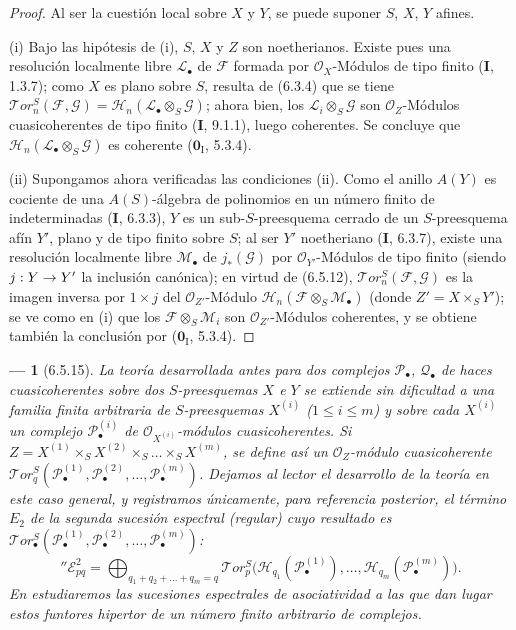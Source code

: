 \documentclass[10pt,oneside,openany]{book}
\theoremstyle{egaenv}\newtheorem*{env}{---}
\theoremstyle{egastatement}
\theoremstyle{egadescription}
\newcommand{\oldpage}[2][]{\marginnote{\normalfont\scriptsize\textbf{#1}\,|\,#2}\ignorespaces}
\renewcommand{\to}{\mathchoice{\longrightarrow}{\rightarrow}{\rightarrow}{\rightarrow}}
\begin{document}
\begin{proof}
Al ser la cuestión local sobre $X$ y $Y$, se puede suponer $S$, $X$, $Y$
afines.

\textnormal{(i)} Bajo las hipótesis de (i), $S$, $X$ y $Z$ son noetherianos.
Existe pues una resolución localmente libre $\mathscr L_\bullet$ de
$\mathscr F$ formada por $\mathscr O_X$-Módulos de tipo finito (\textbf{I}, 1.3.7); como
$X$ es plano sobre $S$, resulta de (6.3.4) que se tiene
$\mathscr{T}\!or_n^S(\mathscr F,\mathscr G)
=\mathscr H_n(\mathscr L_\bullet\otimes_S\mathscr G)$;
ahora bien, los $\mathscr L_i\otimes_S\mathscr G$ son $\mathscr O_Z$-Módulos
cuasicoherentes de tipo finito (\textbf{I}, 9.1.1), luego coherentes. Se concluye que
$\mathscr H_n(\mathscr L_\bullet\otimes_S\mathscr G)$ es coherente
($\mathbf{0}_{\mathrm I}$, 5.3.4).

\textnormal{(ii)} Supongamos ahora verificadas las condiciones (ii). Como
el anillo $A(Y)$ es cociente de una $A(S)$-álgebra de polinomios en un número finito
de indeterminadas (\textbf{I}, 6.3.3), $Y$ es un sub-$S$-preesquema cerrado de un
$S$-preesquema afín $Y'$, plano y de tipo finito sobre $S$; al ser $Y'$ noetheriano
(\textbf{I}, 6.3.7), existe una resolución localmente libre $\mathscr M_\bullet$ de
$j_*(\mathscr G)$ por $\mathscr O_{Y'}$-Módulos de tipo finito
(siendo $j:Y\to Y'$ la inclusión canónica); en virtud de (6.5.12),
$\mathscr{T}\!or_n^S(\mathscr F,\mathscr G)$ es la imagen inversa por
$1\times j$ del $\mathscr O_{Z'}$-Módulo
$\mathscr H_n(\mathscr F\otimes_S\mathscr M_\bullet)$ (donde
$Z'=X\times_S Y'$); se ve como en (i) que los
$\mathscr F\otimes_S\mathscr M_i$ son $\mathscr O_{Z'}$-Módulos
coherentes, y se obtiene también la conclusión por ($\mathbf{0}_{\mathrm I}$, 5.3.4).
\end{proof}

\begin{env}[6.5.15]
La teoría desarrollada antes para dos complejos $\mathscr P_\bullet$,
$\mathscr Q_\bullet$ de haces cuasicoherentes sobre dos $S$-preesquemas $X$ e $Y$ se extiende sin dificultad a una
familia finita arbitraria de $S$-preesquemas $X^{(i)}$ ($1\leqslant i\leqslant m$) y sobre
cada $X^{(i)}$ un complejo $\mathscr P_\bullet^{(i)}$ de $\mathscr O_{X^{(i)}}$-módulos
cuasicoherentes. Si
$Z=X^{(1)}\times_S X^{(2)}\times_S\ldots\times_S X^{(m)}$,
se define así un $\mathscr O_Z$-módulo cuasicoherente
$\mathscr{T}\!or_q^S(\mathscr P_\bullet^{(1)},\mathscr P_\bullet^{(2)},
\ldots,\mathscr P_\bullet^{(m)})$.
Dejamos al lector el desarrollo de la teoría en este caso general,
y registramos únicamente, para referencia posterior, el término
$E_2$ de la segunda sucesión espectral
(regular) cuyo resultado es
$\mathscr{T}\!or_\bullet^S(\mathscr P_\bullet^{(1)},
\mathscr P_\bullet^{(2)},\ldots,\mathscr P_\bullet^{(m)})$:
\oldpage[III]{153}
\[
  ''\mathscr E_{pq}^2
  =\bigoplus_{q_1+q_2+\ldots+q_m=q}
   \mathscr{T}\!or_p^S
   \bigl(\mathscr H_{q_1}(\mathscr P_\bullet^{(1)}),\ldots,
         \mathscr H_{q_m}(\mathscr P_\bullet^{(m)})\bigr).
  \tag{6.5.15.1}\label{III.6.5.15.1.fr}
\]
En  estudiaremos las sucesiones espectrales de
asociatividad a las que dan lugar estos funtores hipertor de un
número finito arbitrario de complejos.
\end{env}
\end{document}
